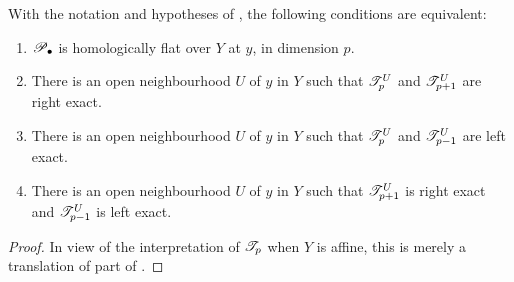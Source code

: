 \begin{proposition}[7.8.3]
\label{III.7.8.3}
With the notation and hypotheses of , the
following conditions are equivalent:
\begin{enumerate}
  \item[a)] $\mathscr{P}_\bullet$ is homologically flat over $Y$
  at $y$, in dimension $p$.
  \item[b)] There is an open neighbourhood $U$ of $y$ in
  $Y$ such that $\mathscr{T}_p^U$ and $\mathscr{T}_{p+1}^U$ are right
  exact.
  \item[c)] There is an open neighbourhood $U$ of $y$ in
  $Y$ such that $\mathscr{T}_p^U$ and $\mathscr{T}_{p-1}^U$ are left
  exact.
  \item[d)] There is an open neighbourhood $U$ of $y$ in
  $Y$ such that $\mathscr{T}_{p+1}^U$ is right exact and
  $\mathscr{T}_{p-1}^U$ is left exact.
\end{enumerate}
\end{proposition}

\begin{proof}
In view of the interpretation of $\mathscr{T}_p$ when $Y$ is
affine, this is merely a translation of part of
.
\end{proof}

